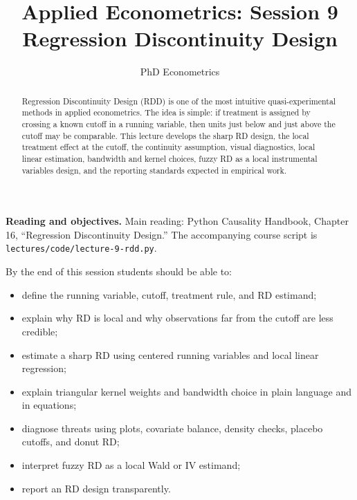 

\title{Applied Econometrics: Session 9\\Regression Discontinuity Design}
\author{PhD Econometrics}
\date{}



\maketitle

\begin{abstract}
Regression Discontinuity Design (RDD) is one of the most intuitive quasi-experimental methods in applied econometrics. The idea is simple: if treatment is assigned by crossing a known cutoff in a running variable, then units just below and just above the cutoff may be comparable. This lecture develops the sharp RD design, the local treatment effect at the cutoff, the continuity assumption, visual diagnostics, local linear estimation, bandwidth and kernel choices, fuzzy RD as a local instrumental variables design, and the reporting standards expected in empirical work.
\end{abstract}

\begin{boxD}
\textbf{Reading and objectives.} Main reading: Python Causality Handbook, Chapter 16, ``Regression Discontinuity Design.'' The accompanying course script is \texttt{lectures/code/lecture-9-rdd.py}.

By the end of this session students should be able to:
\begin{itemize}
    \item define the running variable, cutoff, treatment rule, and RD estimand;
    \item explain why RD is local and why observations far from the cutoff are less credible;
    \item estimate a sharp RD using centered running variables and local linear regression;
    \item explain triangular kernel weights and bandwidth choice in plain language and in equations;
    \item diagnose threats using plots, covariate balance, density checks, placebo cutoffs, and donut RD;
    \item interpret fuzzy RD as a local Wald or IV estimand;
    \item report an RD design transparently.
\end{itemize}
\end{boxD}

